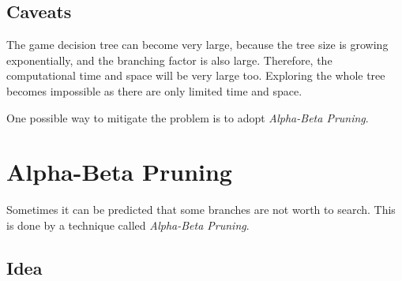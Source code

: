 \documentclass{note}
\begin{document}
\subsection{Caveats}

The game decision tree can become very large, because the tree size is growing exponentially, and the branching factor is also large. Therefore, the computational time and space will be very large too. Exploring the whole tree becomes impossible as there are only limited time and space.

One possible way to mitigate the problem is to adopt \textit{Alpha-Beta Pruning}.

\section{Alpha-Beta Pruning}

Sometimes it can be predicted that some branches are not worth to search. This is done by a technique called \textit{Alpha-Beta Pruning}. 

\subsection{Idea}
\end{document}
